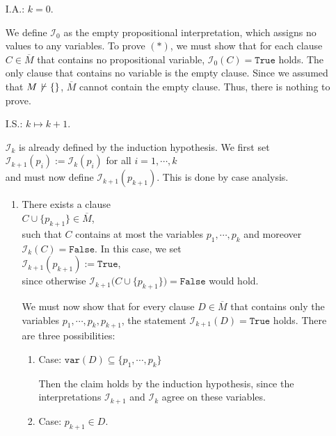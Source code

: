 \begin{enumerate}
\item[I.A.:] $k=0$.
 
  We define $\mathcal{I}_0$ as the empty propositional interpretation, which assigns no
  values to any variables. To prove $(*)$, we must show that for each clause $C \in \overline{M}$ that contains
  no propositional variable, $\mathcal{I}_0(C) = \mathtt{True}$ holds. The only clause that contains
  no variable is the empty clause. Since we assumed that $M \not\,\vdash \{\}$,
  $\overline{M}$ cannot contain the empty clause. Thus, there is nothing to prove.
\item[I.S.:] $k \mapsto k+1$.

  $\mathcal{I}_k$ is already defined by the induction hypothesis. We first set
  \\[0.2cm]
  \hspace*{1.3cm}
  $\mathcal{I}_{k+1}(p_i) := \mathcal{I}_k(p_i)$ \quad for all $i=1,\cdots,k$
  \\[0.2cm]
  and must now define $\mathcal{I}_{k+1}(p_{k+1})$. This is done by case analysis.
  \begin{enumerate}
  \item There exists a clause
    \\[0.2cm]
    \hspace*{1.3cm}
    $C \cup \{p_{k+1}\} \in \overline{M}$,
    \\[0.2cm]
    such that $C$ contains at most the variables $p_1,\cdots,p_k$ and moreover $\mathcal{I}_k(C) = \mathtt{False}$.
    In this case, we set
    \\[0.2cm]
    \hspace*{1.3cm}
    $\mathcal{I}_{k+1}(p_{k+1}) := \mathtt{True}$,
    \\[0.2cm]    
    since otherwise $\mathcal{I}_{k+1}\bigl(C \cup \{p_{k+1}\}\bigr) = \mathtt{False}$ would hold. 

    We must now show that for every clause $D \in \overline{M}$ that contains only the variables \linebreak
    $p_1,\cdots,p_k,p_{k+1}$, the statement $\mathcal{I}_{k+1}(D) = \mathtt{True}$ holds. There are three
    possibilities:
    \begin{enumerate}[1.]
    \item Case: $\mathtt{var}(D) \subseteq \{p_1,\cdots,p_k\}$

          Then the claim holds by the induction hypothesis, since the interpretations
          $\mathcal{I}_{k+1}$ and $\mathcal{I}_k$ agree on these variables.
    \item Case: $p_{k+1} \in D$.
          

\end{enumerate}
\end{enumerate}
\end{enumerate}
